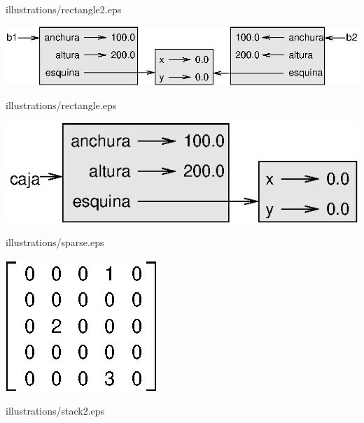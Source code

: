 









illustrations/rectangle2.eps

\centerline{\includegraphics{illustrations/rectangle2.eps}}

illustrations/rectangle.eps

\centerline{\includegraphics{illustrations/rectangle.eps}}

illustrations/sparse.eps

\centerline{\includegraphics{illustrations/sparse.eps}}

illustrations/stack2.eps

